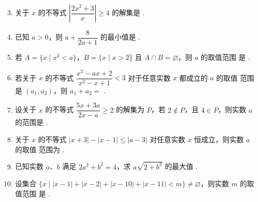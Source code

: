 \documentclass[a4paper,11pt]{article}
\begin{document}


\begin{enumerate}
\setcounter{enumi}{2}

\item 关于 $x$ 的不等式 $\left|\dfrac{2x^2+3}{x}\right|\geqslant4$ 的解集是 \blankline[4.4em].


\item 已知 $a>0$，则 $a+\dfrac{8}{2a+1}$ 的最小值是 \blankline[4.4em].

\ifanswer
\solbegin
{}
\solend

\fi

\item 若 $A=\{x\mid x^2<a\}$，$B=\{x\mid x>2\}$ 且 $A\cap B=\varnothing$，则 $a$ 的取值范围
是 \blankline[4.4em].

\ans{$(-\infty,4]$}

\item 若关于 $x$ 的不等式 $\dfrac{x^2-ax+2}{x^2-x+1}<3$ 对于任意实数 $x$ 都成立的 $a$ 的取值
范围是 $(a_1,a_2)$，则 $a_1+a_2=$ \blankline[4.4em].


\item 设关于 $x$ 的不等式 $\dfrac{5x+3a}{2x-a}\geqslant2$ 的解集为 $P$，若 $2\notin P$，且
$4\in P$，则实数 $a$ 的范围是 \blankline[4.4em].

\ans{$\left[-\dfrac45,-\dfrac25\right)\cup[4,8)$}

\item 关于 $x$ 的不等式 $|x+3|-|x-1|\leqslant|a-3|$ 对任意实数 $x$ 恒成立，则实数 $a$ 的取值
范围为 \blankline[4.4em].

\ans{$(-\infty,-1]\cup[7,+\infty)$}

\item 已知实数 $a$、$b$ 满足 $2a^2+b^2=4$，求 $a\sqrt{2+b^2}$ 的最大值 \blankline[4.4em].


\item 设集合 $\{x\mid|x-1|+|x-2|+|x-10|+|x-11|<m\}\neq\varnothing$，则实数 $m$ 的取值范围
是 \blankline[4.4em].



\end{enumerate}
\end{document}
